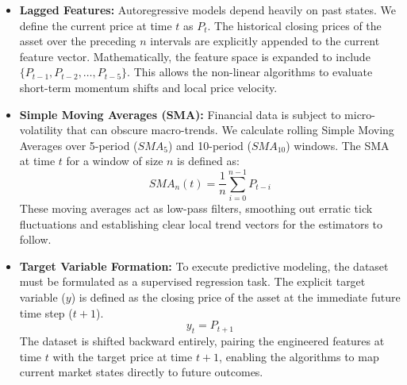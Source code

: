 \documentclass[conference]{IEEEtran}
\begin{document}
\begin{itemize}
    \item \textbf{Lagged Features:} Autoregressive models depend heavily on past states. We define the current price at time $t$ as $P_t$. The historical closing prices of the asset over the preceding $n$ intervals are explicitly appended to the current feature vector. Mathematically, the feature space is expanded to include $\{P_{t-1}, P_{t-2}, \dots, P_{t-5}\}$. This allows the non-linear algorithms to evaluate short-term momentum shifts and local price velocity.
    \item \textbf{Simple Moving Averages (SMA):} Financial data is subject to micro-volatility that can obscure macro-trends. We calculate rolling Simple Moving Averages over 5-period ($SMA_5$) and 10-period ($SMA_{10}$) windows. The SMA at time $t$ for a window of size $n$ is defined as:
    \begin{equation}
        SMA_n(t) = \frac{1}{n} \sum_{i=0}^{n-1} P_{t-i}
    \end{equation}
    These moving averages act as low-pass filters, smoothing out erratic tick fluctuations and establishing clear local trend vectors for the estimators to follow.
    \item \textbf{Target Variable Formation:} To execute predictive modeling, the dataset must be formulated as a supervised regression task. The explicit target variable ($y$) is defined as the closing price of the asset at the immediate future time step ($t+1$). 
    \begin{equation}
        y_t = P_{t+1}
    \end{equation}
    The dataset is shifted backward entirely, pairing the engineered features at time $t$ with the target price at time $t+1$, enabling the algorithms to map current market states directly to future outcomes.
\end{itemize}
\end{document}
